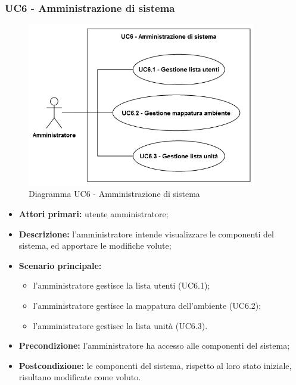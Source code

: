 \subsubsection{UC6 - Amministrazione di sistema}
	\begin{figure}[H]
		\centering
		\includegraphics[width=10cm]{images/UC6.png}
		\caption{Diagramma UC6 - Amministrazione di sistema}
	\end{figure}
	\begin{itemize}
		\item \textbf{Attori primari:} utente amministratore;
		\item \textbf{Descrizione:} l'amministratore intende visualizzare le componenti del sistema, ed apportare le modifiche volute;
		\item \textbf{Scenario principale:} 
			\begin{itemize}
				\item l'amministratore gestisce la lista utenti (UC6.1);
				\item l'amministratore gestisce la mappatura dell'ambiente (UC6.2);
				\item l'amministratore gestisce la lista unità (UC6.3).
			\end{itemize}
		\item \textbf{Precondizione:} l'amministratore ha accesso alle componenti del sistema;
		\item \textbf{Postcondizione:} le componenti del sistema, rispetto al loro stato iniziale, risultano modificate come voluto.
	\end{itemize}
	
